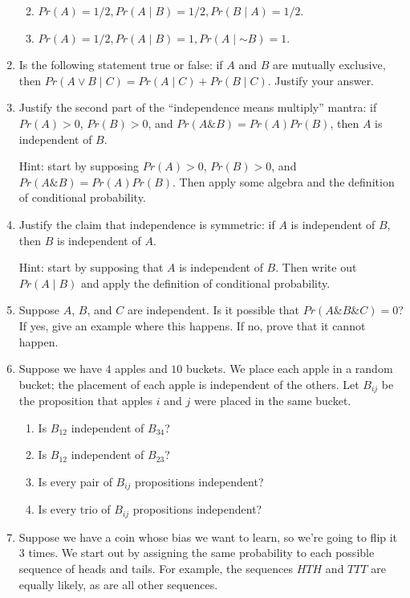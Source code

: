 \documentclass[justified]{tufte-book}
\providecommand{\tightlist}{%
  \setlength{\itemsep}{0pt}\setlength{\parskip}{0pt}}
\newcommand{\given}{\mid}
\renewcommand{\neg}{\mathbin{\sim}}
\renewcommand{\wedge}{\mathbin{\&}}
\newcommand{\p}{Pr}
\theoremstyle{definition}
\theoremstyle{definition}
\theoremstyle{definition}
\theoremstyle{definition}
\theoremstyle{remark}
\begin{document}
\begin{enumerate}
  \begin{enumerate}
  \def\labelenumii{\alph{enumii}.}
  \tightlist
  \item
    \(\p(A) = 1/2, \p(A \given B) = 1/2, \p(B \given A) = 1/2\).
  \item
    \(\p(A) = 1/2, \p(A \given B) = 1, \p(A \given \neg B) = 1\).
  \end{enumerate}
\item
  Is the following statement true or false: if \(A\) and \(B\) are mutually exclusive, then \(Pr(A \vee B \given C) = Pr(A \given C) + Pr(B \given C)\). Justify your answer.
\item
  Justify the second part of the ``independence means multiply'' mantra: if \(\p(A) > 0\), \(\p(B) > 0\), and \(\p(A \wedge B) = \p(A) \p(B)\), then \(A\) is independent of \(B\).

  Hint: start by supposing \(\p(A) > 0\), \(\p(B) > 0\), and \(\p(A \wedge B) = \p(A)\p(B)\). Then apply some algebra and the definition of conditional probability.
\item
  Justify the claim that independence is symmetric: if \(A\) is independent of \(B\), then \(B\) is independent of \(A\).

  Hint: start by supposing that \(A\) is independent of \(B\). Then write out \(\p(A \given B)\) and apply the definition of conditional probability.
\item
  Suppose \(A\), \(B\), and \(C\) are independent. Is it possible that \(\p(A \wedge B \wedge C) = 0\)? If yes, give an example where this happens. If no, prove that it cannot happen.
\item
  Suppose we have \(4\) apples and \(10\) buckets. We place each apple in a random bucket; the placement of each apple is independent of the others. Let \(B_{ij}\) be the proposition that apples \(i\) and \(j\) were placed in the same bucket.

  \begin{enumerate}
  \def\labelenumii{\alph{enumii}.}
  \tightlist
  \item
    Is \(B_{12}\) independent of \(B_{34}\)?
  \item
    Is \(B_{12}\) independent of \(B_{23}\)?
  \item
    Is every pair of \(B_{ij}\) propositions independent?
  \item
    Is every trio of \(B_{ij}\) propositions independent?
  \end{enumerate}
\item
  Suppose we have a coin whose bias we want to learn, so we're going to flip it \(3\) times. We start out by assigning the same probability to each possible sequence of heads and tails. For example, the sequences \(HTH\) and \(TTT\) are equally likely, as are all other sequences.


\end{enumerate}
\end{document}
